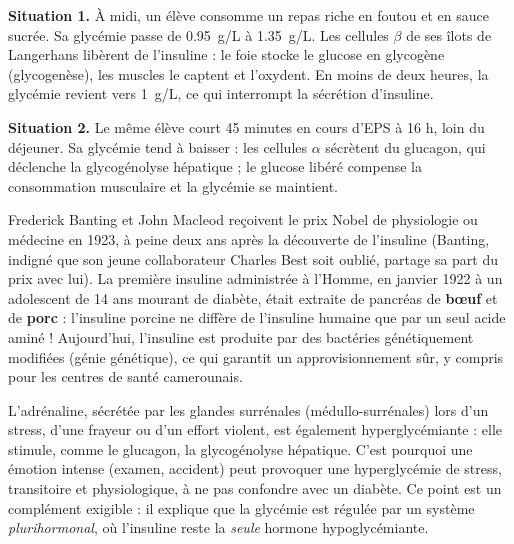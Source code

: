 \documentclass[11pt]{article}
\newcommand{\cle}[1]{{\popxbold\color{popdark}#1}}
\begin{document}
\begin{exemplebox}
\textbf{Situation 1.} À midi, un élève consomme un repas riche en foutou et en sauce sucrée. Sa glycémie passe de \SI{0,95}{g/L} à \SI{1,35}{g/L}. Les cellules $\beta$ de ses îlots de Langerhans libèrent de l'insuline : le foie stocke le glucose en glycogène (glycogenèse), les muscles le captent et l'oxydent. En moins de deux heures, la glycémie revient vers \SI{1}{g/L}, ce qui interrompt la sécrétion d'insuline.

\textbf{Situation 2.} Le même élève court 45 minutes en cours d'EPS à 16 h, loin du déjeuner. Sa glycémie tend à baisser : les cellules $\alpha$ sécrètent du glucagon, qui déclenche la glycogénolyse hépatique ; le glucose libéré compense la consommation musculaire et la glycémie se maintient.
\end{exemplebox}

\begin{savaistu}
Frederick Banting et John Macleod reçoivent le prix Nobel de physiologie ou médecine en 1923, à peine deux ans après la découverte de l'insuline (Banting, indigné que son jeune collaborateur Charles Best soit oublié, partage sa part du prix avec lui). La première insuline administrée à l'Homme, en janvier 1922 à un adolescent de 14 ans mourant de diabète, était extraite de pancréas de \textbf{bœuf} et de \textbf{porc} : l'insuline porcine ne diffère de l'insuline humaine que par un seul acide aminé ! Aujourd'hui, l'insuline est produite par des bactéries génétiquement modifiées (génie génétique), ce qui garantit un approvisionnement sûr, y compris pour les centres de santé camerounais.
\end{savaistu}

\begin{aretenir}
L'\cle{adrénaline}, sécrétée par les glandes \cle{surrénales} (médullo-surrénales) lors d'un stress, d'une frayeur ou d'un effort violent, est également \cle{hyperglycémiante} : elle stimule, comme le glucagon, la glycogénolyse hépatique. C'est pourquoi une émotion intense (examen, accident) peut provoquer une \cle{hyperglycémie de stress}, transitoire et physiologique, à ne pas confondre avec un diabète. Ce point est un complément exigible : il explique que la glycémie est régulée par un système \emph{plurihormonal}, où l'insuline reste la \emph{seule} hormone hypoglycémiante.
\end{aretenir}
\end{document}

